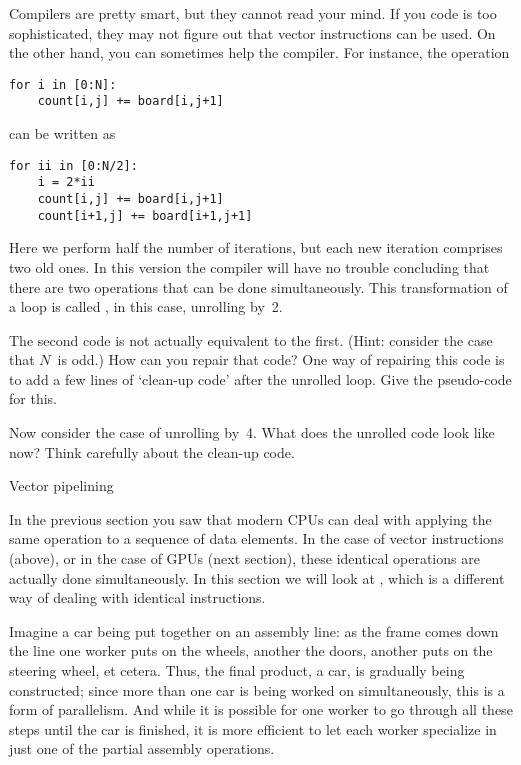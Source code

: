 Compilers are pretty smart, but they cannot read your mind. If you code is too
sophisticated, they may not figure out that vector instructions can be used.
On the other hand, you can sometimes help the compiler. For instance,
the operation
\begin{verbatim}
for i in [0:N]:
    count[i,j] += board[i,j+1]
\end{verbatim}
can be written as
\begin{verbatim}
for ii in [0:N/2]:
    i = 2*ii
    count[i,j] += board[i,j+1]
    count[i+1,j] += board[i+1,j+1]
\end{verbatim}
Here we perform half the number of iterations, but each new iteration
comprises two old ones.
In this version the compiler will have no trouble concluding
that there are two operations that can be done simultaneously. This 
transformation of a loop is
called , in this case, unrolling by~2.

\begin{exercise}
  The second code is not actually equivalent to the first. (Hint:
  consider the case that $N$~is odd.) How can you repair that code?
  One way of repairing this code is to add a few lines of `clean-up code'
  after the unrolled loop. Give the pseudo-code for this.

  Now consider the case of unrolling by~4. What does the unrolled code
  look like now? Think carefully about the clean-up code.
\end{exercise}

 {Vector pipelining}
\label{sec:pipeline}

In the previous section you saw that modern CPUs can deal with
applying the same operation to a sequence of data elements.  In the
case of vector instructions (above), or in the case of GPUs (next
section), these identical operations are
actually done simultaneously. In this section we will look
at , which is a different way
of dealing with identical instructions.

Imagine a car being put together on an assembly line: as the frame comes
down the line one worker puts on the wheels, another the doors,
another puts on the steering wheel, et cetera. Thus, the final
product, a car, is gradually being constructed; since more than one
car is being worked on simultaneously, this is a form of
parallelism. And while it is
possible for one worker to go through all these steps
until the car is finished, it is more efficient to let each worker
specialize in just one of the partial assembly operations.

